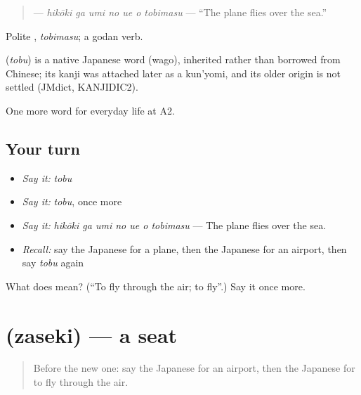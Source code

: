 \begin{quote}
\textbf{   } — \emph{hikōki ga umi no ue o tobimasu} — \textquotedblleft{}The plane flies over the sea.\textquotedblright{}
\end{quote}

Polite \textbf{}, \emph{tobimasu}; a godan verb.

\begin{cousinweb}
\textbf{} (\emph{tobu}) is a native Japanese word (wago), inherited rather than borrowed from Chinese; its kanji was attached later as a kun'yomi, and its older origin is not settled (JMdict, KANJIDIC2).
\end{cousinweb}

\begin{grammarlens}[title={What you've built}]
One more word for everyday life at A2.
\end{grammarlens}

\subsection*{Your turn}
\begin{itemize}
\raggedright
  \item \emph{Say it:} \emph{tobu}
  \item \emph{Say it:} \emph{tobu}, once more
  \item \emph{Say it:} \emph{hikōki ga umi no ue o tobimasu} — The plane flies over the sea.
  \item \emph{Recall:} say the Japanese for a plane, then the Japanese for an airport, then say \emph{tobu} again
\end{itemize}

\begin{tcolorbox}[breakable,colback=teal!4,colframe=teal!35!black,title={Before you move on}]
What does  mean? (\textquotedblleft{}To fly through the air; to fly\textquotedblright{}.) Say it once more.
\end{tcolorbox}
\section[\texorpdfstring{\ja{ざせき} (zaseki)}{ざせき (zaseki)}]{ (zaseki) — a seat}

\label{lesson:JA-C203-zaseki}



\begin{quote}
Before the new one: say the Japanese for an airport, then the Japanese for to fly through the air.
\end{quote}

